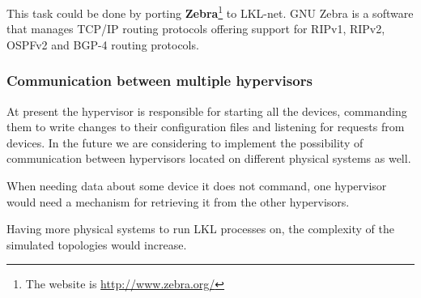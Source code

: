This task could be done by porting \textbf{Zebra}\footnote{The website is \url{http://www.zebra.org/}} to LKL-net. GNU Zebra is a software that manages TCP/IP routing protocols offering support for  RIPv1, RIPv2, OSPFv2 and BGP-4 routing protocols.

\subsubsection{Communication between multiple hypervisors}
\label{sec:hypervisor-comm}
At present the hypervisor is responsible for starting all the devices, commanding them to write changes to their configuration files and listening for requests from devices. In the future we are considering to implement the possibility of communication between hypervisors located on different physical systems as well. 

When needing data about some device it does not command, one hypervisor would need a mechanism for retrieving it from the other hypervisors. 

Having more physical systems to run LKL processes on, the complexity of the simulated topologies would increase.
